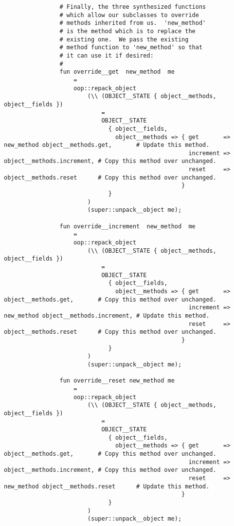 \begin{verbatim}
                # Finally, the three synthesized functions
                # which allow our subclasses to override
                # methods inherited from us.  'new_method'
                # is the method which is to replace the
                # existing one.  We pass the existing
                # method function to 'new_method' so that
                # it can use it if desired:
                #
                fun override__get  new_method  me
                    =
                    oop::repack_object
                        (\\ (OBJECT__STATE { object__methods, object__fields })
                            =
                            OBJECT__STATE
                              { object__fields,
                                object__methods => { get       => new_method object__methods.get,       # Update this method.
                                                     increment =>            object__methods.increment, # Copy this method over unchanged.
                                                     reset     =>            object__methods.reset      # Copy this method over unchanged.
                                                   }
                              }
                        )
                        (super::unpack__object me);

                fun override__increment  new_method  me
                    =
                    oop::repack_object
                        (\\ (OBJECT__STATE { object__methods, object__fields })
                            =
                            OBJECT__STATE
                              { object__fields,
                                object__methods => { get       =>            object__methods.get,       # Copy this method over unchanged.
                                                     increment => new_method object__methods.increment, # Update this method.
                                                     reset     =>            object__methods.reset      # Copy this method over unchanged.
                                                   }
                              }
                        )
                        (super::unpack__object me);

                fun override__reset new_method me
                    =
                    oop::repack_object
                        (\\ (OBJECT__STATE { object__methods, object__fields })
                            =
                            OBJECT__STATE
                              { object__fields,
                                object__methods => { get       =>            object__methods.get,       # Copy this method over unchanged.
                                                     increment =>            object__methods.increment, # Copy this method over unchanged. 
                                                     reset     => new_method object__methods.reset      # Update this method.
                                                   }
                              }
                        )
                        (super::unpack__object me);



\end{verbatim}

